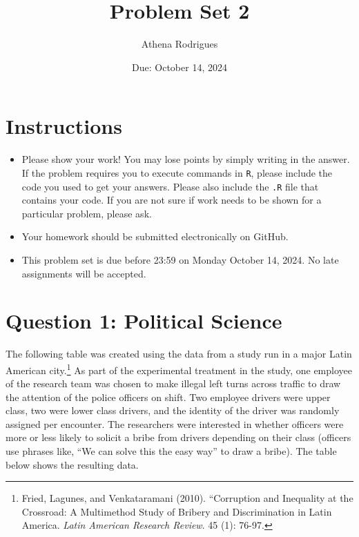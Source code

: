 \documentclass[12pt,letterpaper]{article}
\title{Problem Set 2}
\date{Due: October 14, 2024}
\author{Athena Rodrigues}
\begin{document}
	\maketitle
	\section*{Instructions}
\begin{itemize}
	\item Please show your work! You may lose points by simply writing in the answer. If the problem requires you to execute commands in \texttt{R}, please include the code you used to get your answers. Please also include the \texttt{.R} file that contains your code. If you are not sure if work needs to be shown for a particular problem, please ask.
	\item Your homework should be submitted electronically on GitHub.
	\item This problem set is due before 23:59 on Monday October 14, 2024. No late assignments will be accepted.

\end{itemize}

	
	\vspace{.5cm}
	\section*{Question 1: Political Science}
		\vspace{.2cm}
	The following table was created using the data from a study run in a major Latin American city.\footnote{Fried, Lagunes, and Venkataramani (2010). ``Corruption and Inequality at the Crossroad: A Multimethod Study of Bribery and Discrimination in Latin America. \textit{Latin American Research Review}. 45 (1): 76-97.} As part of the experimental treatment in the study, one employee of the research team was chosen to make illegal left turns across traffic to draw the attention of the police officers on shift. Two employee drivers were upper class, two were lower class drivers, and the identity of the driver was randomly assigned per encounter. The researchers were interested in whether officers were more or less likely to solicit a bribe from drivers depending on their class (officers use phrases like, ``We can solve this the easy way'' to draw a bribe). The table below shows the resulting data.
\end{document}
